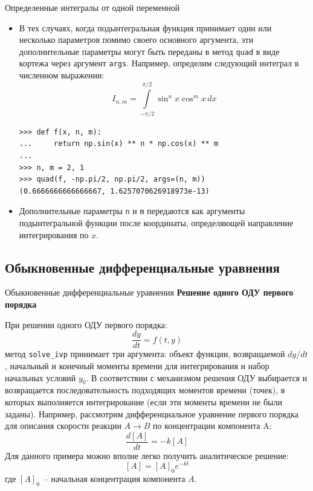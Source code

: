 \documentclass[aspectratio=169, mathserif]{beamer}	%
\begin{document}
\begin{frame}[fragile, label=c]{Определенные интегралы от одной переменной}
\scriptsize
\begin{itemize}
	\item В тех случаях, когда подынтегральная функция принимает один или несколько параметров помимо своего основного аргумента, эти дополнительные параметры могут быть переданы в метод \texttt{quad} в виде кортежа через аргумент \texttt{args}.
	Например, определим следующий интеграл в численном выражении:
\vfill
$$
	I_{n,m} = \int\limits_{-\pi/2}^{\pi/2}\sin^nx\cos^mx\, dx
$$
\vfill
\begin{verbatim}
>>> def f(x, n, m):
...     return np.sin(x) ** n * np.cos(x) ** m
...
>>> n, m = 2, 1
>>> quad(f, -np.pi/2, np.pi/2, args=(n, m))
(0.6666666666666667, 1.6257070626918973e-13)
\end{verbatim}
\vfill
	\item Дополнительные параметры \texttt{n} и \texttt{m} передаются как аргументы подынтегральной функции после координаты, определяющей направление интегрирования по $x$.
\end{itemize}
\vfill
\end{frame}



\subsection{Обыкновенные дифференциальные уравнения}
\begin{frame}[fragile, label=c]{Обыкновенные дифференциальные уравнения}
\scriptsize
\textcolor{tpugreen}{\textbf{Решение одного ОДУ первого порядка}}

При решении одного ОДУ первого порядка:
\vfill
$$
	\dfrac{dy}{dt} = f(t, y)
$$
\vfill
\noindent метод \texttt{solve\_ivp} принимает три аргумента: объект функции, возвращаемой $dy/dt$, начальный и конечный моменты времени для интегрирования и набор начальных условий $y_0$.
\vfill
В соответствии с механизмом решения ОДУ выбирается и возвращается последовательность подходящих моментов времени (точек), в которых выполняется интегрирование (если эти моменты времени не были заданы).
\vfill
Например, рассмотрим дифференциальное уравнение первого порядка для описания скорости реакции $A \rightarrow B$ по концентрации компонента A:
\vfill
$$
	\dfrac{d\left[A\right]}{dt} = -k\left[A\right]
$$
\vfill
Для данного примера можно вполне легко получить аналитическое решение:
\vfill
$$
	\left[A\right] = \left[A\right]_0e^{-kt}
$$
\vfill
\noindent где $\left[A\right]_0$~-- начальная концентрация компонента $A$.
\vfill
\end{frame}
\end{document}

